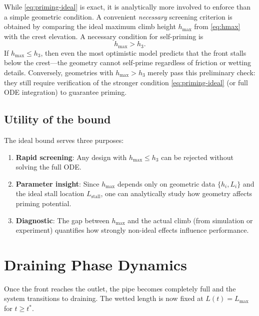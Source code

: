 \documentclass[11pt]{article}
\theoremstyle{definition}
\begin{document}
While \eqref{eq:priming-ideal} is exact, it is analytically more involved to enforce than a
simple geometric condition. A convenient \emph{necessary} screening criterion is obtained by
comparing the ideal maximum climb height $h_{\max}$ from \eqref{eq:hmax} with the crest
elevation. A necessary condition for self-priming is
\begin{equation}
  \boxed{h_{\max} > h_3.}
  \label{eq:priming-criterion}
\end{equation}
If $h_{\max} \le h_3$, then even the most optimistic model predicts that the front stalls 
below the crest---the geometry cannot self-prime regardless of friction or wetting details.
Conversely, geometries with $h_{\max} > h_3$ merely pass this preliminary check: they still
require verification of the stronger condition \eqref{eq:priming-ideal} (or full ODE
integration) to guarantee priming.

\subsection{Utility of the bound}

The ideal bound serves three purposes:
\begin{enumerate}[nosep]
  \item \textbf{Rapid screening}: Any design with $h_{\max} \le h_3$ can be rejected without 
        solving the full ODE.
  \item \textbf{Parameter insight}: Since $h_{\max}$ depends only on geometric data 
        $\{h_i, L_i\}$ and the ideal stall location $L_{\text{stall}}$, one can analytically 
        study how geometry affects priming potential.
  \item \textbf{Diagnostic}: The gap between $h_{\max}$ and the actual climb (from 
        simulation or experiment) quantifies how strongly non-ideal effects influence 
        performance.
\end{enumerate}

\section{Draining Phase Dynamics}
\label{sec:draining}

Once the front reaches the outlet, the pipe becomes completely full and the system 
transitions to draining. The wetted length is now fixed at $L(t) = L_{\max}$ for $t \ge t^*$.
\end{document}
